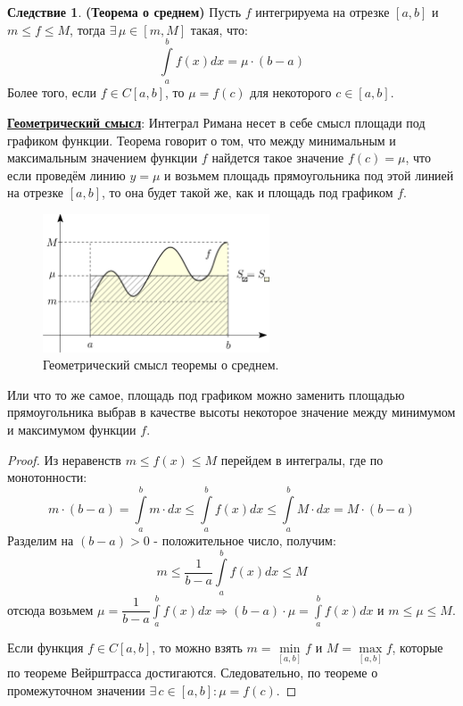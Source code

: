 \documentclass[12pt]{article}
\theoremstyle{definition}
\newtheorem{corollary}{Следствие}
\newcommand{\ddint}[2]{\displaystyle\int\limits_{#1}^{#2}}
\begin{document}
\begin{corollary}\textbf{(Теорема о среднем)}
	Пусть $f$ интегрируема на отрезке $[a,b]$ и $m \leq f \leq M$, тогда $\exists \, \mu \in [m,M]$ такая, что:
	$$
		\ddint{a}{b}f(x)dx = \mu{\cdot}(b-a)	
	$$
	Более того, если $f \in C[a,b]$, то $\mu = f(c)$ для некоторого $c \in [a,b]$.
\end{corollary}

\textbf{\uline{Геометрический смысл}}: Интеграл Римана несет в себе смысл площади под графиком функции. Теорема говорит о том, что между минимальным и максимальным значением функции $f$ найдется такое значение $f(c) = \mu$, что если проведём линию $y = \mu$ и возьмем площадь прямоугольника под этой линией на отрезке $[a,b]$, то она будет такой же, как и площадь под графиком $f$.
\begin{figure}[H]
	\centering
	\includegraphics[width=0.6\textwidth]{21_5.png}
	\caption{Геометрический смысл теоремы о среднем.}
	\label{21_5}
\end{figure}
Или что то же самое, площадь под графиком можно заменить площадью прямоугольника выбрав в качестве высоты некоторое значение между минимумом и максимумом функции $f$.
\begin{proof}
	Из неравенств $m \leq f(x) \leq M$ перейдем в интегралы, где по монотонности:
	$$
		m{\cdot}(b-a) = \ddint{a}{b}m{\cdot}dx \leq \ddint{a}{b}f(x)dx \leq \ddint{a}{b}M{\cdot}dx = M{\cdot}(b-a)
	$$
	Разделим на $(b-a) > 0$ - положительное число, получим:
	$$
		m \leq \dfrac{1}{b-a}\ddint{a}{b}f(x)dx \leq M
	$$
	отсюда возьмем $\mu = \dfrac{1}{b-a}\ddint{a}{b}f(x)dx \Rightarrow (b-a){\cdot}\mu = \ddint{a}{b}f(x)dx$ и $m \leq \mu \leq M$.
	
	Если функция $f \in C[a,b]$, то можно взять $m = \min\limits_{[a,b]}f$ и $M = \max\limits_{[a,b]}f$, которые по теореме Вейрштрасса достигаются. Следовательно, по теореме о промежуточном значении $\exists \, c \in [a,b] \colon \mu = f(c)$.
\end{proof}
\end{document}
